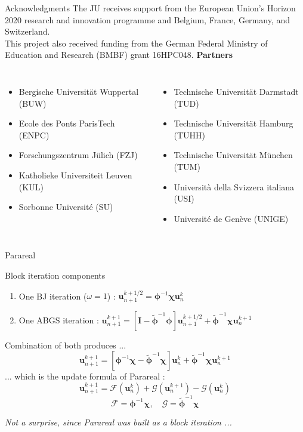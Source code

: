 \documentclass[11pt,aspectratio=43]{beamer}
\newcommand{\matr}[1]{\mathbf{#1}}
\newcommand{\vect}[1]{\boldsymbol{#1}}
\newcommand{\uvect}{\vect{u}}
\newcommand{\phiApprox}{\bm{\tilde{\phi}}}
\begin{document}
\begin{frame}{Acknowledgments}
	The JU receives support from the European Union’s Horizon 2020 research
	and innovation programme and Belgium, France, Germany, and Switzerland.\\
	This project also received funding from the German Federal Ministry of
	Education and Research (BMBF) grant 16HPC048.\vskip10pt	
	\textbf{Partners}
	\begin{columns}
		\begin{itemize}
			\item Bergische Universität Wuppertal (BUW)
			\item Ecole des Ponts ParisTech (ENPC)
			\item Forschungszentrum Jülich (FZJ)
			\item Katholieke Universiteit Leuven (KUL)
			\item Sorbonne Université (SU)
		\end{itemize}
		\begin{itemize}
			\item Technische Universität Darmstadt (TUD)
			\item Technische Universität Hamburg (TUHH)
			\item Technische Universität München (TUM)
			\item Università della Svizzera italiana (USI)
			\item Université de Genève (UNIGE)
		\end{itemize}
	\end{columns}
	\vspace*{-35pt}
\end{frame}

\appendix

\begin{frame}{Parareal}
	\begin{block}{Block iteration components}
		\begin{enumerate}
			\item One BJ iteration ($\omega=1$) : $\uvect_{n+1}^{k+1/2} = \bm{\phi}^{-1}\bm{\chi} \uvect_{n}^k$
			\item One ABGS iteration : $\uvect_{n+1}^{k+1} = [\matr{I} - \bm{\phiApprox}^{-1}\bm{\phi}]\uvect_{n+1}^{k+1/2} + \bm{\phiApprox}^{-1}\bm{\chi} \uvect_{n}^{k+1}$
		\end{enumerate}
	\end{block}\vskip10pt
	Combination of both produces ...
	$$\uvect_{n+1}^{k+1} = [\bm{\phi}^{-1}\bm{\chi} - \bm{\phiApprox}^{-1}\bm{\chi}]\uvect_{n}^k + \bm{\phiApprox}^{-1}\bm{\chi} \uvect_{n}^{k+1}$$
	... which is the update formula of Parareal :
	$$\uvect_{n+1}^{k+1} = \mathcal{F}(\uvect_{n}^k) + \mathcal{G}(\uvect_{n}^{k+1}) - \mathcal{G}(\uvect_{n}^{k})$$
	$$ \mathcal{F} = \bm{\phi}^{-1}\bm{\chi}, \quad \mathcal{G} = \bm{\phiApprox}^{-1}\bm{\chi}$$
	\begin{center}
		\textit{Not a surprise, since Parareal was built as a block iteration ...}
	\end{center}
\end{frame}
\end{document}
